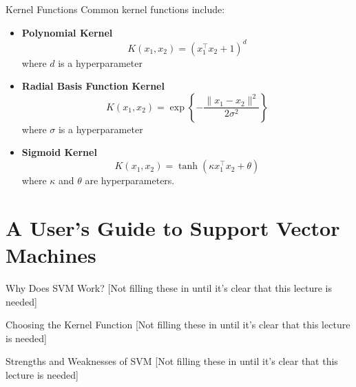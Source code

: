 \documentclass[12pt,t]{beamer}
\begin{document}
\begin{frame}{Kernel Functions} 
\vskip-0.4cm
Common kernel functions include:
\vskip0.2cm
\begin{itemize}
\item \textbf{Polynomial Kernel}
\[
K(x_1, x_2) = (x_1^\top x_2 + 1)^d
\]
where $d$ is a hyperparameter
\vskip0.2cm
\item \textbf{Radial Basis Function Kernel}
\[
K(x_1, x_2) = \exp\left\{ -\frac{\| x_1 - x_2\|^2}{2\sigma^2} \right\}
\]
where $\sigma$ is a hyperparameter
\vskip0.2cm
\item \textbf{Sigmoid Kernel}
\[
K(x_1, x_2) = \tanh (\kappa x_1^\top x_2  + \theta)
\]
where $\kappa$ and $\theta$ are hyperparameters.
\end{itemize}
\end{frame}

\section{A User's Guide to Support Vector Machines}

\begin{frame}{Why Does SVM Work?} 
[Not filling these in until it's clear that this lecture is needed]
\end{frame}

\begin{frame}{Choosing the Kernel Function} 
[Not filling these in until it's clear that this lecture is needed]
\end{frame}

\begin{frame}{Strengths and Weaknesses of SVM} 
[Not filling these in until it's clear that this lecture is needed]
\end{frame}
\end{document}
